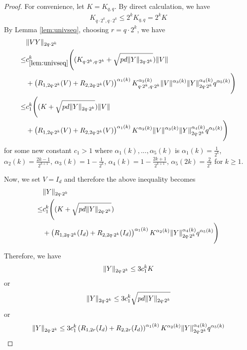 \documentclass[11pt]{amsart}
\numberwithin{equation}{section}
\numberwithin{equation}{section}
\DeclarePairedDelimiter{\norm}{\lVert}{\rVert}
\begin{document}
\begin{proof}
For convenience, let $K=K_{q,q}$. By direct calculation, we have
\begin{align*}
    K_{q \cdot 2^k,q \cdot 2^k} \le 2^k K_{q,q}=2^k K
\end{align*}
By Lemma \ref{lem:univseq}, choosing $r=q \cdot 2^k $, we have
\begin{align*}
    &\norm{VY}_{2q \cdot 2^k} \\\le& c_{\ref{lem:univseq}}^k \Bigg((K_{q \cdot 2^k,q \cdot 2^k}+\sqrt{pd\norm{Y}_{2q \cdot 2^k}})\norm{V} \\&+ \left(R_{1,2q \cdot 2^k}(V)+R_{2,2q \cdot 2^k}(V)\right)^{\alpha_1(k)}K_{q \cdot 2^k,q \cdot 2^k}^{\alpha_2(k)}\norm{V}^{\alpha_3(k)} \norm{Y}_{2q \cdot 2^k}^{\alpha_4(k)}q^{\alpha_5(k)}\Bigg)
    \\ \le & c_1^k \Bigg((K+\sqrt{pd\norm{Y}_{2q \cdot 2^k}})\norm{V} \\&+ \left(R_{1,2q \cdot 2^k}(V)+R_{2,2q \cdot 2^k}(V)\right)^{\alpha_1(k)}K^{\alpha_2(k)}\norm{V}^{\alpha_3(k)} \norm{Y}_{2q \cdot 2^k}^{\alpha_4(k)}q^{\alpha_5(k)}\Bigg)
\end{align*}
for some new constant $c_1>1$ where $\alpha_1(k),...,\alpha_5(k)$ is $\alpha_1(k)=\frac{1}{2^k}$, $\alpha_2(k)=\frac{2k-1}{2^{k+1}}$, $\alpha_3(k)=1-\frac{1}{2^k}$, $\alpha_4(k)=1-\frac{2k+1}{2^{k+1}}$, $\alpha_5(2k)=\frac{2}{2^k}$ for $k \ge 1$.

Now, we set $V=I_d$ and therefore the above inequality becomes
\begin{align*}
    &\norm{Y}_{2q \cdot 2^k} \\\le& c_{1}^k \Bigg((K+\sqrt{pd\norm{Y}_{2q \cdot 2^k}}) \\&+ \left(R_{1,2q \cdot 2^k}(I_d)+R_{2,2q \cdot 2^k}(I_d)\right)^{\alpha_1(k)}K^{\alpha_2(k)}\norm{Y}_{2q \cdot 2^k}^{\alpha_4(k)}q^{\alpha_5(k)}\Bigg)
\end{align*}

Therefore, we have
\begin{align*}
    \norm{Y}_{2q\cdot 2^k} \le 3c_{1}^k K
\end{align*}
or
\begin{align*}
    \norm{Y}_{2q\cdot 2^k} \le 3c_{1}^k\sqrt{pd\norm{Y}_{2q\cdot 2^k}}
\end{align*}
or
\begin{align*}
    \norm{Y}_{2q \cdot 2^k} \le 3c_{1}^k\left(R_{1,2r}(I_d)+R_{2,2r}(I_d)\right)^{\alpha_1(k)}K^{\alpha_2(k)} \norm{Y}_{2q \cdot 2^k}^{\alpha_4(k)}q^{\alpha_5(k)}
\end{align*}


\end{proof}
\end{document}
